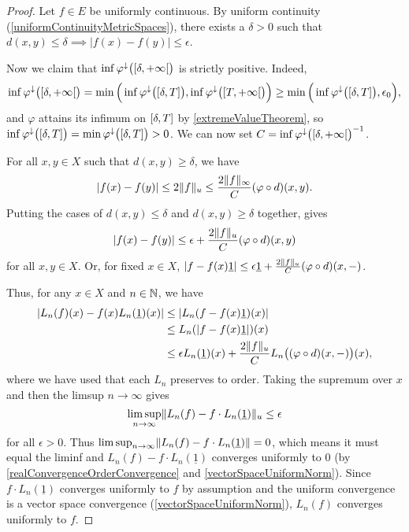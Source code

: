 \begin{proof}
Let $f\in E$ be uniformly continuous. By uniform continuity (\ref{uniformContinuityMetricSpaces}), there exists a $\delta > 0$ such that $d(x,y)\leq \delta \implies |f(x)-f(y)| \leq \epsilon$.

Now we claim that $\inf\varphi^\imf\big(\interval[co]{\delta, +\infty}\big)$ is strictly positive. Indeed,
\[ \inf\varphi^\imf\big(\interval[co]{\delta, +\infty}\big) = \min \Big(\inf\varphi^\imf\big(\interval{\delta, T}\big), \inf\varphi^\imf\big(\interval[co]{T, +\infty}\big) \Big) \geq \min\Big(\inf\varphi^\imf\big(\interval{\delta, T}\big), \epsilon_0\Big), \]
and $\varphi$ attains its infimum on $\interval{\delta, T}$ by \ref{extremeValueTheorem}, so $\inf\varphi^\imf\big(\interval{\delta, T}\big) = \min\varphi^\imf\big(\interval{\delta, T}\big) > 0$. We can now set $C = \inf\varphi^\imf\big(\interval[co]{\delta, +\infty}\big)^{-1}$.

For all $x,y\in X$ such that $d(x,y) \geq \delta$, we have
\[ |f(x) - f(y)| \leq 2\lVert f\rVert_u \leq \frac{2\lVert f\rVert_\infty}{C}(\varphi\circ d)(x,y). \]
Putting the cases of $d(x,y) \leq \delta$ and $d(x,y) \geq \delta$ together, gives
\[ |f(x) - f(y)| \leq \epsilon + \frac{2\lVert f\rVert_u}{C}(\varphi\circ d)(x,y) \]
for all $x,y\in X$. Or, for fixed $x\in X$, $|f - f(x)\underline{1}| \leq \epsilon\underline{1} + \frac{2\lVert f\rVert_u}{C}(\varphi\circ d)(x,-)$.

Thus, for any $x\in X$ and $n\in \mathbb{N}$, we have
\begin{align*}
|L_n(f)(x) - f(x)L_n(\underline{1})(x)| &\leq |L_n(f - f(x)\underline{1})(x)| \\
&\leq L_n(|f - f(x) \underline{1}|)(x) \\
&\leq \epsilon L_n(\underline{1})(x) + \frac{2\lVert f\rVert_u}{C}L_n\big((\varphi\circ d)(x,-)\big)(x),
\end{align*}
where we have used that each $L_n$ preserves to order. Taking the supremum over $x$ and then the limsup $n\to \infty$ gives
\[ \limsup_{n\to\infty}\lVert L_n(f) - f\cdot L_n(\underline{1})\rVert_u \leq \epsilon \]
for all $\epsilon >0$. Thus $\limsup_{n\to\infty}\lVert L_n(f) - f\cdot L_n(\underline{1})\rVert = 0$, which means it must equal the liminf and $L_n(f) - f\cdot L_n(\underline{1})$ converges uniformly to $0$ (by \ref{realConvergenceOrderConvergence} and \ref{vectorSpaceUniformNorm}). Since $f\cdot L_n(\underline{1})$ converges uniformly to $f$ by assumption and the uniform convergence is a vector space convergence (\ref{vectorSpaceUniformNorm}), $L_n(f)$ converges uniformly to $f$.
\end{proof}
